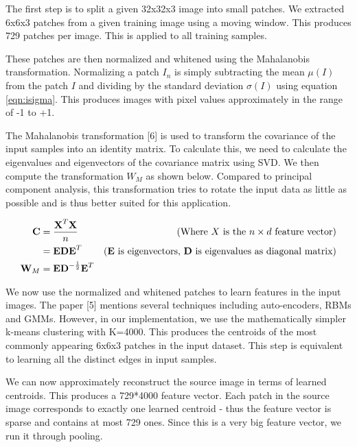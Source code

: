\documentclass{article} %
\begin{document}
        The first step is to split a given 32x32x3 image into small patches. We extracted 6x6x3 patches from a given training image using a moving window. This produces 729 patches per image. This is applied to all training samples.

        These patches are then normalized and whitened using the Mahalanobis transformation. Normalizing a patch $I_n$ is simply subtracting the mean $\mu(I)$ from the patch $I$ and dividing by the standard deviation $\sigma(I)$ using equation \ref{eqn:isigma}. This produces images with pixel values approximately in the range of -1 to +1.
        

        The Mahalanobis transformation [6] is used to transform the covariance of the input samples into an identity matrix. To calculate this, we need to calculate the eigenvalues and eigenvectors of the covariance matrix using SVD. We then compute the transformation \textbf{$W_{M}$} as shown below. Compared to principal component analysis, this transformation tries to rotate the input data as little as possible and is thus better suited for this application.

        \begin{align*}
            \textbf{C} &= \frac{\textbf{X}^{T}\textbf{X}}{n} & \text{(Where $X$ is the $n\times d$ feature vector)}\\
            &= \textbf{EDE}^{T} & \text{(\textbf{E} is eigenvectors, \textbf{D} is eigenvalues as diagonal matrix)}\\
            \textbf{W}_{M} &= \textbf{ED}^{-\frac{1}{2}}\textbf{E}^{T}\\
        \end{align*}

        We now use the normalized and whitened patches to learn features in the input images. The paper [5] mentions several techniques including auto-encoders, RBMs and GMMs. However, in our implementation, we use the mathematically simpler k-means clustering with K=4000. This produces the centroids of the most commonly appearing 6x6x3 patches in the input dataset. This step is equivalent to learning all the distinct edges in input samples.

        We can now approximately reconstruct the source image in terms of learned centroids. This produces a 729*4000 feature vector. Each patch in the source image corresponds to exactly one learned centroid - thus the feature vector is sparse and contains at most 729 ones. Since this is a very big feature vector, we run it through pooling.
\end{document}
